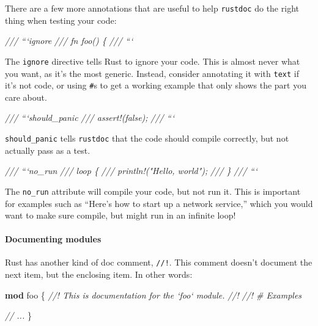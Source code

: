 \documentclass[a4paper,]{book}
\newenvironment{Shaded}{\begin{snugshade}}{\end{snugshade}}
\newcommand{\KeywordTok}[1]{\textcolor[rgb]{0.13,0.29,0.53}{\textbf{{#1}}}}
\newcommand{\CommentTok}[1]{\textcolor[rgb]{0.56,0.35,0.01}{\textit{{#1}}}}
\newcommand{\NormalTok}[1]{{#1}}
\let\oldparagraph\paragraph
\renewcommand{\paragraph}[1]{\oldparagraph{#1}\mbox{}}
\begin{document}
There are a few more annotations that are useful to help
\texttt{rustdoc} do the right thing when testing your code:

\begin{Shaded}
\begin{Highlighting}[]
\CommentTok{/// ```ignore}
\CommentTok{/// fn foo() \{}
\CommentTok{/// ```}
\end{Highlighting}
\end{Shaded}

The \texttt{ignore} directive tells Rust to ignore your code. This is
almost never what you want, as it's the most generic. Instead, consider
annotating it with \texttt{text} if it's not code, or using \texttt{\#}s
to get a working example that only shows the part you care about.

\begin{Shaded}
\begin{Highlighting}[]
\CommentTok{/// ```should_panic}
\CommentTok{/// assert!(false);}
\CommentTok{/// ```}
\end{Highlighting}
\end{Shaded}

\texttt{should\_panic} tells \texttt{rustdoc} that the code should
compile correctly, but not actually pass as a test.

\begin{Shaded}
\begin{Highlighting}[]
\CommentTok{/// ```no_run}
\CommentTok{/// loop \{}
\CommentTok{///     println!("Hello, world");}
\CommentTok{/// \}}
\CommentTok{/// ```}
\end{Highlighting}
\end{Shaded}

The \texttt{no\_run} attribute will compile your code, but not run it.
This is important for examples such as ``Here's how to start up a
network service,'' which you would want to make sure compile, but might
run in an infinite loop!

\paragraph{Documenting modules}\label{documenting-modules}

Rust has another kind of doc comment, \texttt{//!}. This comment doesn't
document the next item, but the enclosing item. In other words:

\begin{Shaded}
\begin{Highlighting}[]
\KeywordTok{mod} \NormalTok{foo \{}
    \CommentTok{//! This is documentation for the `foo` module.}
    \CommentTok{//!}
    \CommentTok{//! # Examples}

    \CommentTok{// ...}
\NormalTok{\}}
\end{Highlighting}
\end{Shaded}
\end{document}
